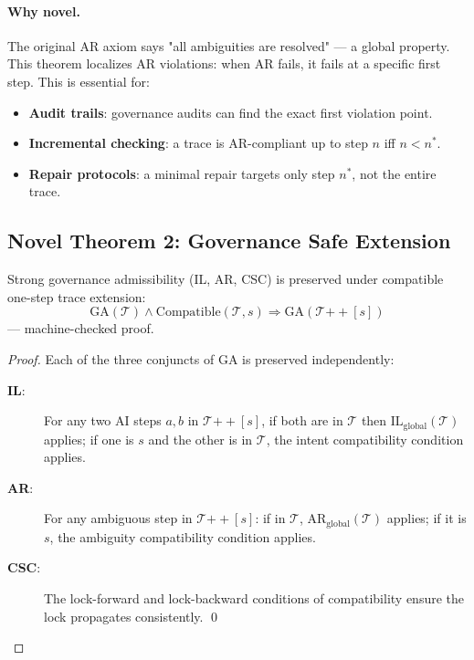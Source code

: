 \paragraph{Why novel.} The original AR axiom says "all ambiguities are resolved"
--- a global property. This theorem localizes AR violations: when AR fails, it
fails at a specific first step. This is essential for:
\begin{itemize}
  \item \textbf{Audit trails}: governance audits can find the exact first violation
        point.
  \item \textbf{Incremental checking}: a trace is AR-compliant up to step $n$ iff
        $n < n^*$.
  \item \textbf{Repair protocols}: a minimal repair targets only step $n^*$, not
        the entire trace.
\end{itemize}

\subsection{Novel Theorem 2: Governance Safe Extension}

\begin{theorem}
Strong governance admissibility (IL, AR, CSC) is preserved under compatible
one-step trace extension:
\[
  \mathrm{GA}(\mathcal{T}) \wedge \mathrm{Compatible}(\mathcal{T}, s)
  \Rightarrow
  \mathrm{GA}(\mathcal{T} \mathbin{+\!\!+} [s])
\]
--- machine-checked proof.
\end{theorem}
\begin{proof}
Each of the three conjuncts of $\mathrm{GA}$ is preserved independently:
\begin{description}
  \item[\textbf{IL}:] For any two AI steps $a, b$ in $\mathcal{T}
        \mathbin{+\!\!+} [s]$, if both are in $\mathcal{T}$ then
        $\mathrm{IL}_{\mathrm{global}}(\mathcal{T})$ applies; if one is $s$ and
        the other is in $\mathcal{T}$, the intent compatibility condition applies.
  \item[\textbf{AR}:] For any ambiguous step in $\mathcal{T}
        \mathbin{+\!\!+} [s]$: if in $\mathcal{T}$,
        $\mathrm{AR}_{\mathrm{global}}(\mathcal{T})$ applies; if it is $s$, the
        ambiguity compatibility condition applies.
  \item[\textbf{CSC}:] The lock-forward and lock-backward conditions of
        compatibility ensure the lock propagates consistently. \qed
\end{description}
\end{proof}

